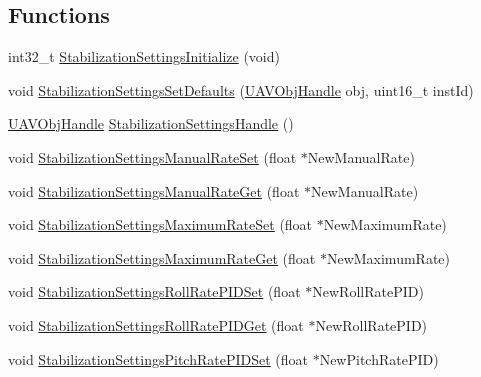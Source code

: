 \subsection*{\-Functions}
\begin{DoxyCompactItemize}
\item 
int32\-\_\-t \hyperlink{group___stabilization_settings_ga7b540dfc6771eff96a228c1a31538a50}{\-Stabilization\-Settings\-Initialize} (void)
\item 
void \hyperlink{group___stabilization_settings_ga2255fc4ee2e93aa63e3942c09f9df56a}{\-Stabilization\-Settings\-Set\-Defaults} (\hyperlink{targets_2_u_a_v_objects_2inc_2uavobjectmanager_8h_a279053e22be53ce9f895043aaeb91e3b}{\-U\-A\-V\-Obj\-Handle} obj, uint16\-\_\-t inst\-Id)
\item 
\hyperlink{targets_2_u_a_v_objects_2inc_2uavobjectmanager_8h_a279053e22be53ce9f895043aaeb91e3b}{\-U\-A\-V\-Obj\-Handle} \hyperlink{group___stabilization_settings_ga8b74c0f1f3af1f435d6f1b169c7e58e8}{\-Stabilization\-Settings\-Handle} ()
\item 
void \hyperlink{group___stabilization_settings_gaaec66c5f5bf9b2036b3eacb076342220}{\-Stabilization\-Settings\-Manual\-Rate\-Set} (float $\ast$\-New\-Manual\-Rate)
\item 
void \hyperlink{group___stabilization_settings_ga5a5c56b1110600394dafa3a861444c8a}{\-Stabilization\-Settings\-Manual\-Rate\-Get} (float $\ast$\-New\-Manual\-Rate)
\item 
void \hyperlink{group___stabilization_settings_gaf54c73f15fc28251c00881f195852c8d}{\-Stabilization\-Settings\-Maximum\-Rate\-Set} (float $\ast$\-New\-Maximum\-Rate)
\item 
void \hyperlink{group___stabilization_settings_gaaa8cf64ca42effa57c5d0322ade3321f}{\-Stabilization\-Settings\-Maximum\-Rate\-Get} (float $\ast$\-New\-Maximum\-Rate)
\item 
void \hyperlink{group___stabilization_settings_ga6f0b20ab41b71f28eb3f95cef3b5c24b}{\-Stabilization\-Settings\-Roll\-Rate\-P\-I\-D\-Set} (float $\ast$\-New\-Roll\-Rate\-P\-I\-D)
\item 
void \hyperlink{group___stabilization_settings_gab02fd473901fce09f50dd1f2b5cab2ba}{\-Stabilization\-Settings\-Roll\-Rate\-P\-I\-D\-Get} (float $\ast$\-New\-Roll\-Rate\-P\-I\-D)
\item 
void \hyperlink{group___stabilization_settings_ga40a3113be96b93813b8a89d2cf06892a}{\-Stabilization\-Settings\-Pitch\-Rate\-P\-I\-D\-Set} (float $\ast$\-New\-Pitch\-Rate\-P\-I\-D)
\item 

\end{DoxyCompactItemize}
